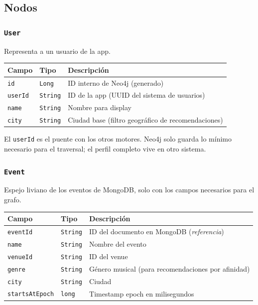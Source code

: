 \documentclass[12pt, a4paper]{article}
\newcommand{\code}[1]{\texttt{#1}}
\begin{document}
\subsection{Nodos}

\subsubsection{\code{User}}

Representa a un usuario de la app.

\begin{tabularx}{\textwidth}{@{}llX@{}}
  \toprule
  \textbf{Campo} & \textbf{Tipo} & \textbf{Descripción} \\
  \midrule
  \code{id}       & \code{Long}   & ID interno de Neo4j (generado) \\
  \code{userId}   & \code{String} & ID de la app (UUID del sistema de usuarios) \\
  \code{name}     & \code{String} & Nombre para display \\
  \code{city}     & \code{String} & Ciudad base (filtro geográfico de recomendaciones) \\
  \bottomrule
\end{tabularx}

\vspace{0.5em}
El \code{userId} es el puente con los otros motores. Neo4j solo guarda lo
mínimo necesario para el traversal; el perfil completo vive en otro sistema.

\subsubsection{\code{Event}}

Espejo liviano de los eventos de MongoDB, solo con los campos necesarios
para el grafo.

\begin{tabularx}{\textwidth}{@{}llX@{}}
  \toprule
  \textbf{Campo}        & \textbf{Tipo}   & \textbf{Descripción} \\
  \midrule
  \code{eventId}        & \code{String}   & ID del documento en MongoDB (\emph{referencia}) \\
  \code{name}           & \code{String}   & Nombre del evento \\
  \code{venueId}        & \code{String}   & ID del venue \\
  \code{genre}          & \code{String}   & Género musical (para recomendaciones por afinidad) \\
  \code{city}           & \code{String}   & Ciudad \\
  \code{startsAtEpoch}  & \code{long}     & Timestamp epoch en milisegundos \\
  \bottomrule
\end{tabularx}
\end{document}
